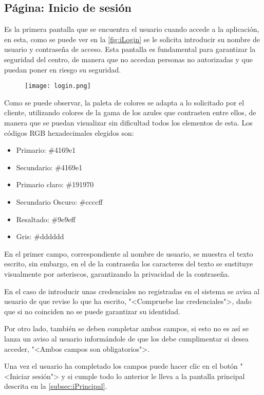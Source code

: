\subsection{Página: Inicio de sesión}\label{subsec:iLogin}
Es la primera pantalla que se encuentra el usuario cuando accede a la aplicación, en esta, como se puede ver en la \autoref{fig:iLogin} se le solicita introducir su nombre de usuario y contraseña de acceso. Esta pantalla es fundamental para garantizar la seguridad del centro, de manera que no accedan personas no autorizadas y que puedan poner en riesgo su seguridad.
\begin{figure}[H]
	{\texttt{[image: login.png]}}
\end{figure}
Como se puede observar, la paleta de colores se adapta a lo solicitado por el cliente, utilizando colores de la gama de los azules que contrasten entre ellos, de manera que se puedan visualizar sin dificultad todos los elementos de esta. Los códigos RGB hexadecimales elegidos son:
\begin{itemize}
	\item Primario: \#4169e1
	\item Secundario: \#4169e1
	\item Primario claro: \#191970
	\item Secundario Oscuro: \#ccccff
	\item Resaltado: \#9e9eff
	\item Gris: \#dddddd
\end{itemize}
En el primer campo, correspondiente al nombre de usuario, se muestra el texto escrito, sin embargo, en el de la contraseña los caracteres del texto se sustituye visualmente por asteriscos, garantizando la privacidad de la contraseña.

En el caso de introducir unas credenciales no registradas en el sistema se avisa al usuario de que revise lo que ha escrito, "<Compruebe las credenciales">, dado que si no coinciden no se puede garantizar su identidad.

Por otro lado, también se deben completar ambos campos, si esto no es así se lanza un aviso al usuario informándole de que los debe cumplimentar si desea acceder, "<Ambos campos son obligatorios">.

Una vez el usuario ha completado los campos puede hacer clic en el botón "<Iniciar sesión"> y si cumple todo lo anterior le lleva a la pantalla principal descrita en la \autoref{subsec:iPrincipal}.

